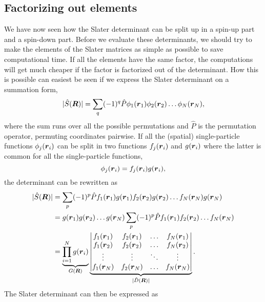 \subsection{Factorizing out elements} \label{sec:factorizing}
We have now seen how the Slater determinant can be split up in a spin-up part and a spin-down part. Before we evaluate these determinants, we should try to make the elements of the Slater matrices as simple as possible to save computational time. If all the elements have the same factor, the computations will get much cheaper if the factor is factorized out of the determinant. How this is possible can easiest be seen if we express the Slater determinant on a summation form,
\begin{equation}
|\hat{S}(\boldsymbol{{R}})|=\sum_{q}(-1)^q\hat{P}\phi_1(\boldsymbol{{r}}_1)\phi_2(\boldsymbol{{r}}_2)\hdots\phi_N(\boldsymbol{{r}}_N),
\label{eq:slatersum}
\end{equation}
where the sum runs over all the possible permutations and $\hat{P}$ is the permutation operator, permuting coordinates pairwise. If all the (spatial) single-particle functions $\phi_j(\boldsymbol{{r}}_i)$ can be split in two functions $f_j(\boldsymbol{{r}}_i)$ and $g(\boldsymbol{{r}}_i)$ where the latter is common for all the single-particle functions,
\begin{equation}
\phi_j(\boldsymbol{{r}}_i)=f_j(\boldsymbol{{r}}_i)g(\boldsymbol{{r}}_i),
\end{equation}
the determinant can be rewritten as
\begin{equation}
\begin{aligned}
|\hat{S}(\boldsymbol{{R}})|&=\sum_{p}(-1)^p\hat{P}f_1(\boldsymbol{{r}}_1)g(\boldsymbol{{r}}_1)f_2(\boldsymbol{{r}}_2)g(\boldsymbol{{r}}_2)\hdots f_N(\boldsymbol{{r}}_N)g(\boldsymbol{{r}}_N)\\
&=g(\boldsymbol{{r}}_1)g(\boldsymbol{{r}}_2)\hdots g(\boldsymbol{{r}}_N)\sum_{p}(-1)^p\hat{P}f_1(\boldsymbol{{r}}_1)f_2(\boldsymbol{{r}}_2)\hdots f_N(\boldsymbol{{r}}_N)\\
&=\underbrace{\prod_{i=1}^Ng(\boldsymbol{{r}}_i)}_{G(\boldsymbol{{R}})}
\underbrace{\begin{vmatrix}
f_1(\boldsymbol{r}_1) & f_2(\boldsymbol{r}_1) & \hdots & f_N(\boldsymbol{r}_1)\\
f_1(\boldsymbol{r}_2) & f_2(\boldsymbol{r}_2) & \hdots & f_N(\boldsymbol{r}_2)\\
\vdots & \vdots & \ddots & \vdots \\
f_1(\boldsymbol{r}_N) & f_2(\boldsymbol{r}_N) & \hdots & f_N(\boldsymbol{r}_N)
\end{vmatrix}}_{|\hat{D}(\boldsymbol{{R}})|}.
\end{aligned}
\end{equation}
The Slater determinant can then be expressed as
